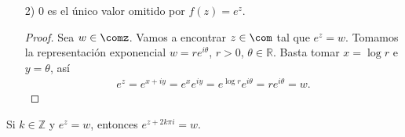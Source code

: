 \begin{enumerate}
\begin{proof}
\begin{align*}
\begin{array}{lcc}
             \end{array}
        \right. \Longleftrightarrow \left\{ \begin{array}{lcc}
            e^x \cdot 1 = 1 \\
            y = k\pi, \ k \in \mathbb{Z}, \ k \text{ par}\\
             \end{array}
        \right. \\
        &\Longleftrightarrow \left\{ \begin{array}{lcc}
            x  = 0 \\
            y = k\pi, \ k \in \mathbb{Z}\\
             \end{array}
        \right. \Longleftrightarrow z - w = 2k\pi i, \ k \in \mathbb{Z}
    \end{align*}
    \end{proof}
    \begin{obs}
    Esto nos dice que $f(z) = e^z$ es inyectiva en cualquier banda horizontal de altura $2\pi$, es decir, del tipo
    \begin{align*}
        S_{y_0} = \{ x + iy \in \com : y \in [y_0, y_0 + 2\pi) \}.
    \end{align*}
    \end{obs}
    \item[2)] $0$ es el único valor omitido por $f(z) = e^z$.
    \begin{proof}
    Sea $w \in \comz$. Vamos a encontrar $z \in \com$ tal que $e^z = w$. Tomamos la representación exponencial $w = re^{i\theta}$, $r>0$, $\theta \in \mathbb{R}$. Basta tomar $x = \log r$ e $y = \theta$, así
    \begin{align*}
        e^z = e^{x + iy} = e^xe^{iy} = e^{\log r}e^{i\theta} = re^{i\theta} = w.
    \end{align*}
    \end{proof}
\end{enumerate}

\begin{obs}
Si $k \in \mathbb{Z}$ y $e^z = w$, entonces $e^{z + 2k\pi i} = w$.
\end{obs}

